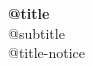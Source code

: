 \begin{center}
  {\Large\bfseries @{title}}\\[0.35em]
  {\large @{subtitle}}\\[0.5em]
  {\small @{title-notice}}
\end{center}

\vspace{0.4em}
{\footnotesize\setlength{\parskip}{0pt}\tableofcontents}
\vspace{0.6em}

